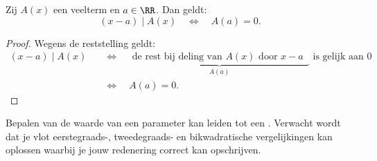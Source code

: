 \documentclass{ximera}
\begin{document}
\begin{stelling}\label{stelling:kenmerkvandeelbaarheid}
Zij $A(x)$ een veelterm en $a \in \RR$. Dan geldt:
\[
(x-a) \mid A(x) \quad \Leftrightarrow \quad A(a) = 0.
\]
\end{stelling}
\begin{proof}
Wegens de reststelling geldt:
\begin{align}
(x-a) \mid A(x) \quad 
& \Leftrightarrow \quad \underbrace{\text{ de rest bij deling van $A(x)$ door $x-a$ }}_{A(a)} \text{ is gelijk aan $0$} \nonumber \\
& \Leftrightarrow \quad A(a) = 0. \tag*{\qedhere}
\end{align}
\end{proof}

Bepalen van de waarde van een parameter kan leiden tot een . Verwacht wordt dat je vlot eerstegraads-, tweedegraads- en bikwadratische vergelijkingen kan oplossen waarbij je jouw redenering correct kan opschrijven. 
\end{document}

